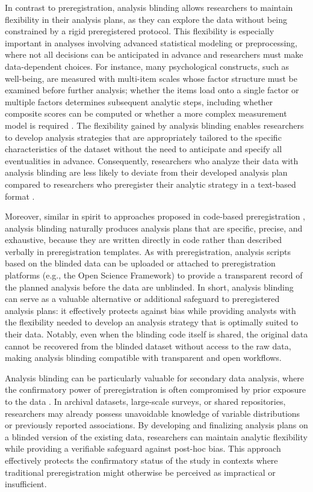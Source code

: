 \documentclass[
]{jss}
\begin{document}
In contrast to preregistration, analysis blinding allows researchers to
maintain flexibility in their analysis plans, as they can explore the
data without being constrained by a rigid preregistered protocol. This
flexibility is especially important in analyses involving advanced
statistical modeling or preprocessing, where not all decisions can be
anticipated in advance and researchers must make data-dependent choices.
For instance, many psychological constructs, such as well-being, are
measured with multi-item scales whose factor structure must be examined
before further analysis; whether the items load onto a single factor or
multiple factors determines subsequent analytic steps, including whether
composite scores can be computed or whether a more complex measurement
model is required \citep[see e.g.,][]{MARP2022discussion}. The
flexibility gained by analysis blinding enables researchers to develop
analysis strategies that are appropriately tailored to the specific
characteristics of the dataset without the need to anticipate and
specify all eventualities in advance. Consequently, researchers who
analyze their data with analysis blinding are less likely to deviate
from their developed analysis plan compared to researchers who
preregister their analytic strategy in a text-based format
\citep{sarafoglou2023comparing}.

Moreover, similar in spirit to approaches proposed in code-based
preregistration \citep{peikert2021reproducible, vanlissa2021worcs},
analysis blinding naturally produces analysis plans that are specific,
precise, and exhaustive, because they are written directly in code
rather than described verbally in preregistration templates. As with
preregistration, analysis scripts based on the blinded data can be
uploaded or attached to preregistration platforms (e.g., the Open
Science Framework) to provide a transparent record of the planned
analysis before the data are unblinded. In short, analysis blinding can
serve as a valuable alternative or additional safeguard to preregistered
analysis plans: it effectively protects against bias while providing
analysts with the flexibility needed to develop an analysis strategy
that is optimally suited to their data. Notably, even when the blinding
code itself is shared, the original data cannot be recovered from the
blinded dataset without access to the raw data, making analysis blinding
compatible with transparent and open workflows.

Analysis blinding can be particularly valuable for secondary data
analysis, where the confirmatory power of preregistration is often
compromised by prior exposure to the data \citep{Thibault2023-of}. In
archival datasets, large-scale surveys, or shared repositories,
researchers may already possess unavoidable knowledge of variable
distributions or previously reported associations. By developing and
finalizing analysis plans on a blinded version of the existing data,
researchers can maintain analytic flexibility while providing a
verifiable safeguard against post-hoc bias. This approach effectively
protects the confirmatory status of the study in contexts where
traditional preregistration might otherwise be perceived as impractical
or insufficient.
\end{document}
